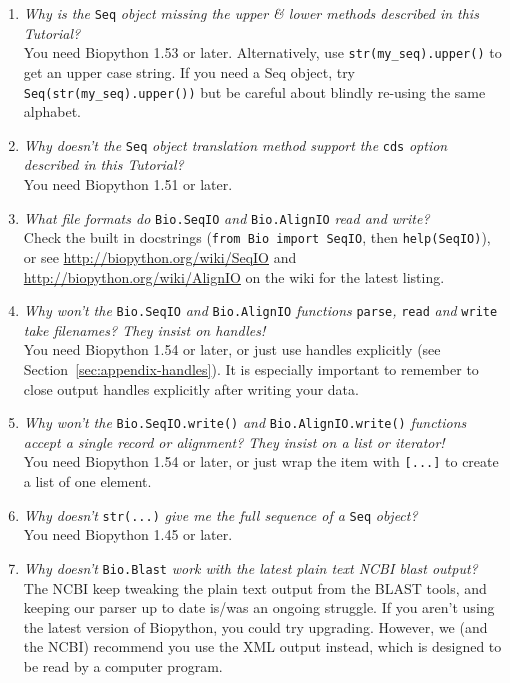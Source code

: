 \documentclass{report}
\begin{document}
\begin{enumerate}
  \item \emph{Why is the} \verb|Seq| \emph{object missing the upper \& lower methods described in this Tutorial?} \\
  You need Biopython 1.53 or later.  Alternatively, use \verb|str(my_seq).upper()| to get an upper case string.
  If you need a Seq object, try \verb|Seq(str(my_seq).upper())| but be careful about blindly re-using the same alphabet.
 
  \item \emph{Why doesn't the} \verb|Seq| \emph{object translation method support the} \verb|cds| \emph{option described in this Tutorial?} \\
  You need Biopython 1.51 or later.

  \item \emph{What file formats do} \verb|Bio.SeqIO| \emph{and} \verb|Bio.AlignIO| \emph{read and write?} \\
  Check the built in docstrings (\texttt{from Bio import SeqIO}, then \texttt{help(SeqIO)}), or see \url{http://biopython.org/wiki/SeqIO} and \url{http://biopython.org/wiki/AlignIO} on the wiki for the latest listing.
  
  \item \emph{Why won't the } \verb|Bio.SeqIO| \emph{and} \verb|Bio.AlignIO| \emph{functions} \verb|parse|\emph{,} \verb|read| \emph{and} \verb|write| \emph{take filenames? They insist on handles!} \\
  You need Biopython 1.54 or later, or just use handles explicitly (see Section~\ref{sec:appendix-handles}).
  It is especially important to remember to close output handles explicitly after writing your data.

  \item \emph{Why won't the } \verb|Bio.SeqIO.write()| \emph{and} \verb|Bio.AlignIO.write()| \emph{functions accept a single record or alignment? They insist on a list or iterator!} \\
  You need Biopython 1.54 or later, or just wrap the item with \verb|[...]| to create a list of one element.

  \item \emph{Why doesn't} \verb|str(...)| \emph{give me the full sequence of a} \verb|Seq| \emph{object?} \\
  You need Biopython 1.45 or later.
  
  \item \emph{Why doesn't} \verb|Bio.Blast| \emph{work with the latest plain text NCBI blast output?} \\
  The NCBI keep tweaking the plain text output from the BLAST tools, and keeping our parser up to date is/was an ongoing struggle.
  If you aren't using the latest version of Biopython, you could try upgrading.
  However, we (and the NCBI) recommend you use the XML output instead, which is designed to be read by a computer program.


\end{enumerate}
\end{document}
